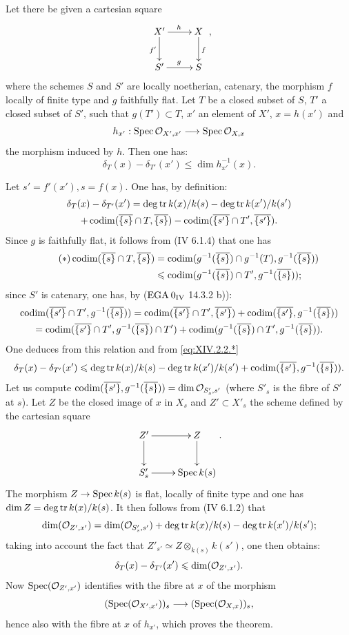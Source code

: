 \begin{sublemma} \label{XIV.2.2.1}
Let there be given a cartesian square
$$
\xymatrix{X'\ar[r]^{h}\ar[d]_{f'}&X\ar[d]^f\\S'\ar[r]^g&S},
$$
where the schemes $S$ and $S'$ are locally noetherian, catenary, the morphism $f$ locally of finite type and $g$ faithfully flat. Let $T$ be a closed subset of $S$, $T'$ a closed subset of $S'$, such that $g(T')\subset T$, $x'$ an element of $X'$, $x=h(x')$ and
$$h_{x'}:\Spec\Oo_{X', x'}\to\Spec\Oo_{X, x}$$
the morphism induced by $h$. Then one has:
$$
\delta_T(x)-\delta_{T'}(x')\leq\dim h_{x'}^{-1}(x).
$$
\end{sublemma}

Let $s'=f'(x'), s=f(x)$. One has, by definition:
\begin{multline*}
\delta_T(x)-\delta_{T'}(x')=\operatorname{deg\,tr} k(x)/k(s)-\operatorname{deg\,tr} k(x')/k(s')\\
+\operatorname{codim}(\overline{\{s\}}\cap T, \overline{\{s\}})-\operatorname{codim}(\overline{\{s'\}}\cap T', \overline{\{s'\}}).
\end{multline*}
Since $g$ is faithfully flat, it follows from (\EGA IV 6.1.4) that one has
\begin{align*} \label{eq:XIV.2.2.*} \tag{$*$}
\operatorname{codim}(\overline{\{s\}}\cap T, \overline{\{s\}})&=\operatorname{codim}(g^{-1}(\overline{\{s\}})\cap g^{-1}(T), g^{-1}(\overline{\{s\}}))\\&\leqslant\operatorname{codim}(g^{-1}(\overline{\{s\}})\cap T', g^{-1}(\overline{\{s\}}));
\end{align*}
since $S'$ is catenary, one has, by ($\textup{EGA}\kern.2em 0_{\textup{IV}}$ 14.3.2 b)):
\begin{multline*}
\operatorname{codim}(\overline{\{s'\}}\cap T', g^{-1}(\overline{\{s\}}))= \operatorname{codim}(\overline{\{s'\}}\cap T', \overline{\{s'\}})+ \operatorname{codim}(\overline{\{s'\}}, g^{-1}(\overline{\{s\}}))\\
= \operatorname{codim}(\overline{\{s'\}}\cap T', g^{-1}(\overline{\{s\}})\cap T')+ \operatorname{codim}(g^{-1}(\overline{\{s\}})\cap T', g^{-1}(\overline{\{s\}})).
\end{multline*}
One deduces from this relation and from \eqref{eq:XIV.2.2.*}
$$
\delta_T(x)-\delta_{T'}(x')\leqslant\operatorname{deg\,tr} k(x)/k(s)-\operatorname{deg\,tr} k(x')/k(s')+\operatorname{codim}(\overline{\{s'\}}, g^{-1}(\overline{\{s\}})).
$$
Let us compute $\operatorname{codim}(\overline{\{s'\}}, g^{-1}(\overline{\{s\}}))=\dim{\mathcal O}_{S'_s, s'}$ (where $S'_s$ is the fibre of $S'$ at $s$). Let $Z$ be the closed image of $x$ in $X_s$ and $Z'\subset X'_s$ the scheme defined by the cartesian square
$$
\xymatrix{Z'\ar[r]\ar[d]&Z\ar[d]\\S'_s\ar[r]&\Spec k(s)}.
$$
The morphism $Z\to \Spec k(s)$ is flat, locally of finite type and one has $\dim Z=\operatorname{deg\,tr} k(x)/k(s)$. It then follows from (\EGA IV 6.1.2) that
$$
\dim({\mathcal O}_{Z', x'})=\dim({\mathcal O}_{S'_s, s'})+\operatorname{deg\,tr} k(x)/k(s)-\operatorname{deg\,tr} k(x')/k(s');$$
taking into account the fact that $Z'_{s'}\simeq Z\otimes_{k(s)}k(s')$, one then obtains:
$$
\delta_T(x)-\delta_{T'}(x')\leqslant\dim({\mathcal O}_{Z', x'}).
$$
Now $\operatorname{Spec}({\mathcal O}_{Z', x'})$ identifies with the fibre at $x$ of the morphism
$$(\Spec(\Oo_{X', x'}))_s\to(\Spec(\Oo_{X, x}))_s,
$$
hence also with the fibre at $x$ of $h_{x'}$, which proves the theorem.

